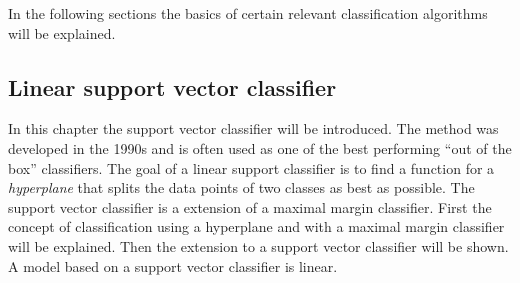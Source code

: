 In the following sections the basics of certain relevant classification algorithms will be explained.

\subsection{Linear support vector classifier}
In this chapter the support vector classifier will be introduced. The method was developed in the 1990s and is often used as one of the best performing ``out of the box'' classifiers. The goal of a linear support classifier is to find a function for a \emph{hyperplane} that splits the data points of two classes as best as possible. The support vector classifier is a extension of a maximal margin classifier. First  the concept of classification using a hyperplane and with a maximal margin classifier will be explained. Then the extension to a support vector classifier will be shown.
A model based on a support vector classifier is linear.
